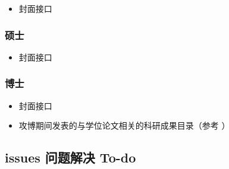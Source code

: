 \begin{itemize}
  \item 封面接口
\end{itemize}


\subsubsection{硕士}

\begin{itemize}
  \item 封面接口
\end{itemize}


\subsubsection{博士}

\begin{itemize}
  \item 封面接口
  \item 攻博期间发表的与学位论文相关的科研成果目录（参考 ）
\end{itemize}



\subsection{issues 问题解决 To-do}

